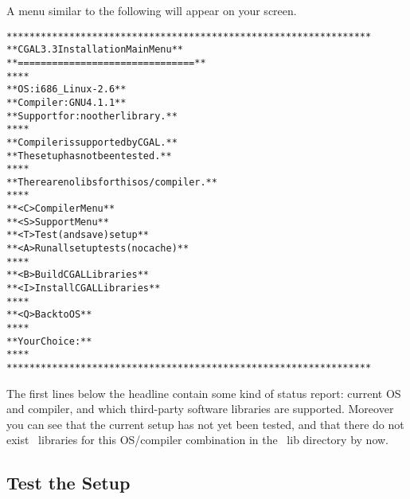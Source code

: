 A menu similar to the following will appear on your screen.

{\ccTexHtml{\scriptsize}{} \label{pic:main-menu}
\begin{alltt}
  ****************************************************************
  **             CGAL 3.3 Installation Main Menu                **
  **             ===============================                **
  **                                                            **
  **   OS:          i686_Linux-2.6                              **
  **   Compiler:    GNU 4.1.1                                   **
  **   Support for: no other library.                           **
  **                                                            **
  **   Compiler is supported by CGAL.                           **
  **   The setup has not been tested.                           **
  **                                                            **
  **   There are no libs for this os/compiler.                  **
  **                                                            **
  **   <C>  Compiler Menu                                       **
  **   <S>  Support Menu                                        **
  **   <T>  Test (and save) setup                               **
  **   <A>  Run all setup tests (no cache)                      **
  **                                                            **
  **   <B>  Build CGAL Libraries                                **
  **   <I>  Install CGAL Libraries                              **
  **                                                            **
  **   <Q>  Back to OS                                          **
  **                                                            **
  **   Your Choice:                                             **
  **                                                            **
  ****************************************************************
\end{alltt}}

The first lines below the headline contain some kind of status report:
current OS and compiler, and which third-party software libraries are
supported. Moreover you can see that the current setup has not yet
been tested, and that there do not exist \cgal\ libraries for this
OS/compiler combination in the \cgal\ lib directory by now.

\subsection{Test the Setup\label{sec:test-the-setup}}

